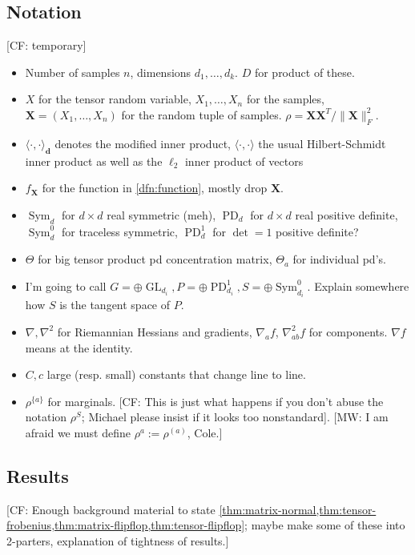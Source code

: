 \documentclass{article}
\renewcommand{\vec}{\bm}
\newcommand\PD{\operatorname{PD}}
\newcommand\Sym{\operatorname{Sym}}
\newcommand\GL{\operatorname{GL}}
\newcommand{\CF}[1]{{\color{purple}[CF: #1]}}
\newcommand{\MW}[1]{{\color{red}[MW: #1]}}
\begin{document}
\subsection{Notation}
\CF{temporary}
\begin{itemize}
\item Number of samples $n$, dimensions $d_1, \dots, d_k$. $D$ for product of these.
\item $X$ for the tensor random variable, $X_1, \dots, X_n$ for the samples, $\vec X = (X_1, \dots, X_n)$ for the random tuple of samples.
$\rho = \vec X \vec X^T/\|\vec X\|_F^2$.
\item $\langle \cdot, \cdot \rangle_{\vec d}$ denotes the modified inner product, $\langle \cdot, \cdot \rangle$ the usual Hilbert-Schmidt inner product as well as the $\ell_2$ inner product of vectors
\item $f_{\vec X}$ for the function in \cref{dfn:function}, mostly drop $\vec X$.
\item $\Sym_d$ for $d \times d$ real symmetric (meh), $\PD_d$ for $d \times d$ real positive definite, $\Sym_d^0$ for traceless symmetric, $\PD_d^1$ for $\det=1$ positive definite?
\item $\Theta$ for big tensor product pd concentration matrix, $\Theta_a$ for individual pd's.
\item I'm going to call $G = \oplus \GL_{d_i}, P = \oplus \PD_{d_i}^1, S = \oplus \Sym_{d_i}^0$. Explain somewhere how $S$ is the tangent space of $P$.
\item $\nabla, \nabla^2$ for Riemannian Hessians and gradients, $\nabla_a f$, $\nabla^2_{ab} f$ for components. $\nabla f$ means at the identity.
\item $C, c$ large (resp. small) constants that change line to line.
\item $\rho^{\{a\}}$ for marginals. \CF{This is just what happens if you don't abuse the notation $\rho^S$; Michael please insist if it looks too nonstandard}. \MW{I am afraid we must define $\rho^a := \rho^{(a)}$, Cole.}
\end{itemize}

\subsection{Results}

\CF{Enough background material to state \cref{thm:matrix-normal,thm:tensor-frobenius,thm:matrix-flipflop,thm:tensor-flipflop}; maybe make some of these into 2-parters, explanation of tightness of results.}
\end{document}
